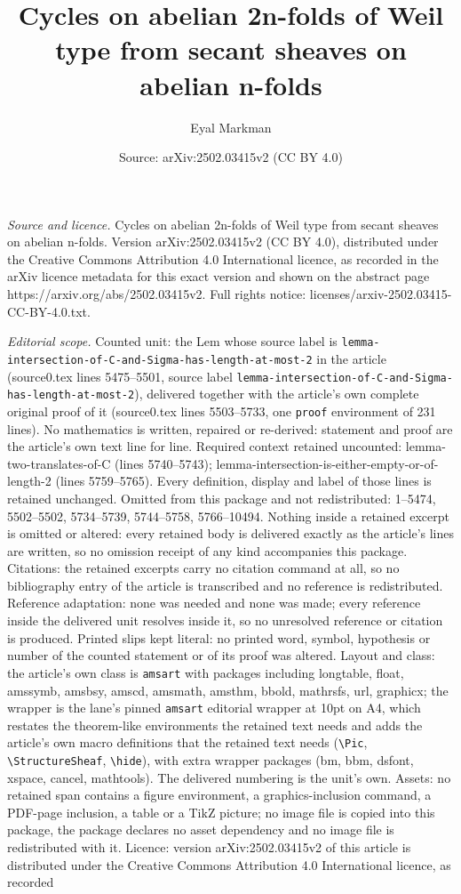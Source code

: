 \documentclass[10pt,a4paper]{amsart}
\title[Cycles on abelian 2n-folds of Weil type from secant sheaves ]{Cycles on abelian 2n-folds of Weil type from secant sheaves on abelian n-folds}
\author{Eyal Markman}
\date{Source: arXiv:2502.03415v2 (CC BY 4.0)}
\begin{document}
\maketitle

\noindent\emph{Source and licence.} Cycles on abelian 2n-folds of Weil type from secant sheaves on abelian n-folds. Version arXiv:2502.03415v2 (CC BY 4.0), distributed under the Creative Commons Attribution 4.0 International licence, as recorded in the arXiv licence metadata for this exact version and shown on the abstract page https://arxiv.org/abs/2502.03415v2. Full rights notice: licenses/arxiv-2502.03415-CC-BY-4.0.txt.\par\smallskip

\noindent\textit{Editorial scope.} Counted unit: the Lem whose source label is \texttt{lemma-intersection-of-C-and-Sigma-has-length-at-most-2} in the article (source0.tex lines 5475--5501, source label \texttt{lemma-intersection-of-C-and-Sigma-has-length-at-most-2}), delivered together with the article's own complete original proof of it (source0.tex lines 5503--5733, one \texttt{proof} environment of 231 lines). No mathematics is written, repaired or re-derived: statement and proof are the article's own text line for line. Required context retained uncounted: lemma-two-translates-of-C (lines 5740--5743); lemma-intersection-is-either-empty-or-of-length-2 (lines 5759--5765). Every definition, display and label of those lines is retained unchanged. Omitted from this package and not redistributed: 1--5474, 5502--5502, 5734--5739, 5744--5758, 5766--10494. Nothing inside a retained excerpt is omitted or altered: every retained body is delivered exactly as the article's lines are written, so no omission receipt of any kind accompanies this package. Citations: the retained excerpts carry no citation command at all, so no bibliography entry of the article is transcribed and no reference is redistributed. Reference adaptation: none was needed and none was made; every reference inside the delivered unit resolves inside it, so no unresolved reference or citation is produced. Printed slips kept literal: no printed word, symbol, hypothesis or number of the counted statement or of its proof was altered. Layout and class: the article's own class is \texttt{amsart} with packages including longtable, float, amssymb, amsbsy, amscd, amsmath, amsthm, bbold, mathrsfs, url, graphicx; the wrapper is the lane's pinned \texttt{amsart} editorial wrapper at 10pt on A4, which restates the theorem-like environments the retained text needs and adds the article's own macro definitions that the retained text needs (\texttt{\textbackslash Pic}, \texttt{\textbackslash StructureSheaf}, \texttt{\textbackslash hide}), with extra wrapper packages (bm, bbm, dsfont, xspace, cancel, mathtools). The delivered numbering is the unit's own. Assets: no retained span contains a figure environment, a graphics-inclusion command, a PDF-page inclusion, a table or a TikZ picture; no image file is copied into this package, the package declares no asset dependency and no image file is redistributed with it. Licence: version arXiv:2502.03415v2 of this article is distributed under the Creative Commons Attribution 4.0 International licence, as recorded 
\end{document}
